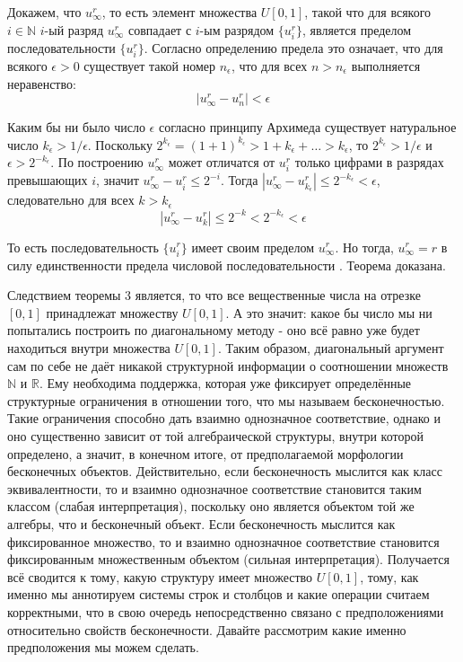 \documentclass[12pt]{article}
\begin{document}
Докажем, что $u^r_{\infty}$, то есть элемент множества $U[0, 1]$, такой что для всякого $i \in \mathbb{N}$ $i$-ый разряд $u^r_{\infty}$ совпадает с $i$-ым разрядом $\{u^r_i\}$, является пределом последовательности $\{u^r_i\}$. Согласно определению предела \cite{matan-define-limit} это означает, что для всякого $\epsilon > 0$ существует такой номер $n_{\epsilon}$, что для всех $n > n_{\epsilon}$ выполняется неравенство:
\begin{equation}
|u^r_{\infty} - u^r_n| < \epsilon
\end{equation}

Каким бы ни было число $\epsilon$ согласно принципу Архимеда \cite{matan-archimed} существует натуральное число $k_{\epsilon} > 1/\epsilon$. Поскольку $2^{k_{\epsilon}} = (1 + 1)^{k_{\epsilon}} > 1 + {k_{\epsilon}} + \dots > k_{\epsilon}$, то $2^{k_{\epsilon}} > 1/\epsilon$ и $\epsilon > 2^{-k_{\epsilon}}$. По построению $u^r_{\infty}$ может отличатся от $u^r_i$ только цифрами в разрядах превышающих $i$, значит $u^r_{\infty} - u^r_i \leq 2^{-i}$. Тогда $|u^r_{\infty} - u^r_{k_{\epsilon}}| \leq 2^{-k_{\epsilon}} < \epsilon$, следовательно для всех $k > k_{\epsilon}$
\begin{equation}
|u^r_{\infty} - u^r_k| \leq 2^{-k} < 2^{-k_{\epsilon}} < \epsilon
\end{equation}

То есть последовательность $\{u^r_i\}$ имеет своим пределом $u^r_{\infty}$. Но тогда, $u^r_{\infty} = r$ в силу единственности предела числовой последовательности \cite{matan-single-limit}. Теорема доказана.

Следствием теоремы 3 является, то что все вещественные числа на отрезке $[0, 1]$ принадлежат множеству $U[0, 1]$. А это значит: какое бы число мы ни попытались построить по диагональному методу - оно всё равно уже будет находиться внутри множества $U[0, 1]$. Таким образом, диагональный аргумент сам по себе не даёт никакой структурной информации о соотношении множеств $\mathbb{N}$ и $\mathbb{R}$. Ему необходима поддержка, которая уже фиксирует определённые структурные ограничения в отношении того, что мы называем бесконечностью. Такие ограничения способно дать взаимно однозначное соответствие, однако и оно существенно зависит от той алгебраической структуры, внутри которой определено, а значит, в конечном итоге, от предполагаемой морфологии бесконечных объектов. Действительно, если бесконечность мыслится как класс эквивалентности, то и взаимно однозначное соответствие становится таким классом (слабая интерпретация), поскольку оно является объектом той же алгебры, что и бесконечный объект. Если бесконечность мыслится как фиксированное множество, то и взаимно однозначное соответствие становится фиксированным множественным объектом (сильная интерпретация). Получается всё сводится к тому, какую структуру имеет множество $U[0, 1]$, тому, как именно мы аннотируем системы строк и столбцов и какие операции считаем корректными, что в свою очередь непосредственно связано с предположениями относительно свойств бесконечности. Давайте рассмотрим какие именно предположения мы можем сделать.
\end{document}
